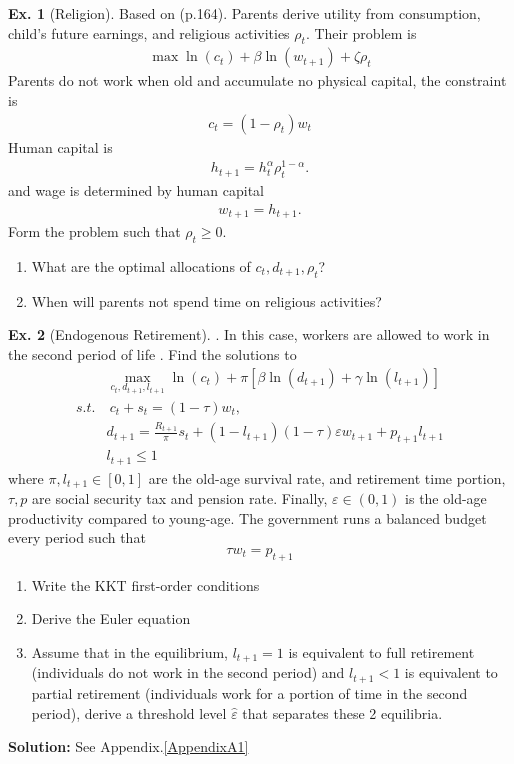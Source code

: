 \documentclass[11pt,a4paper]{book}
\theoremstyle{definition}\newtheorem{definition}{Definition}
\theoremstyle{definition}\newtheorem{fact}{Fact}
\theoremstyle{definition}\newtheorem{remark}{Remark}
\theoremstyle{definition}\newtheorem{ex}{Ex.}
\theoremstyle{definition}\newtheorem{project}{Project}
\theoremstyle{definition}\newtheorem{problem}{Problem}
\theoremstyle{definition}\newtheorem{example}{Example}
\numberwithin{theorem}{section}
\numberwithin{corollary}{chapter}
\numberwithin{assumption}{chapter}
\numberwithin{definition}{chapter}
\numberwithin{prop}{chapter}
\numberwithin{notation}{chapter}
\numberwithin{problem}{chapter}
\numberwithin{example}{chapter}
\numberwithin{fact}{chapter}
\numberwithin{ex}{chapter}
\begin{document}
	\begin{ex}[Religion] Based on \citet{fan2008religious, farmer2021growth} (p.164). Parents derive utility from consumption, child's future earnings, and religious activities $\rho_t$. Their problem is 
	\begin{align*}
		\max \ln(c_t) + \beta \ln (w_{t+1}) + \zeta \rho_t
	\end{align*} 
	Parents do not work when old and accumulate no physical capital, the constraint is
	\begin{align*}
		c_t = (1-\rho_t) w_t
	\end{align*}
	Human capital is
	\begin{align*}
		h_{t+1} = h_t^\alpha \rho_t^{1-\alpha}.
	\end{align*}
	and wage is determined by human capital
	\begin{align*}
		w_{t+1} = h_{t+1}.
	\end{align*}
	Form the problem such that $\rho_t \geq 0$. 
	\begin{enumerate}
		\item What are the optimal allocations of $c_t, d_{t+1}, \rho_t$?
		\item When will parents not spend time on religious activities?
	\end{enumerate}
	\end{ex}
	
	\begin{ex}[Endogenous Retirement]. 
		In this case, workers are allowed to work in the second period of life \citep{TRAN2022101495}.
		Find the solutions to
		\begin{align*}
			&\max_{c_t, d_{t+1}, l_{t+1}} \ln (c_t) + \pi [ \beta \ln(d_{t+1}) + \gamma \ln(l_{t+1})] \\
			s.t. &\ c_t + s_t = (1-\tau) w_t, \\
			& d_{t+1} = \frac{R_{t+1}}{\pi} s_t + (1-l_{t+1})(1-\tau)\varepsilon w_{t+1} + p_{t+1}l_{t+1} \\
			& l_{t+1} \leq 1 
		\end{align*}
		where $\pi,l_{t+1} \in [0,1]$ are the old-age survival rate, and retirement time portion, $\tau, p$ are social security tax and pension rate. Finally, $\varepsilon \in (0,1)$ is the old-age productivity compared to young-age. The government runs a balanced budget every period such that
		$$
		\tau w_t = p_{t+1}
		$$ 
		\begin{enumerate}
			\item Write the KKT first-order conditions
			\item Derive the Euler equation
			\item Assume that in the equilibrium, $l_{t+1} = 1$ is equivalent to full retirement (individuals do not work in the second period) and $l_{t+1} < 1$ is equivalent to partial retirement (individuals work for a portion of time in the second period), derive a threshold level $\hat{\varepsilon}$ that separates these 2 equilibria.
		\end{enumerate}
		\textbf{Solution:} See Appendix.\ref{AppendixA1}
	\end{ex}
	
\end{document}
